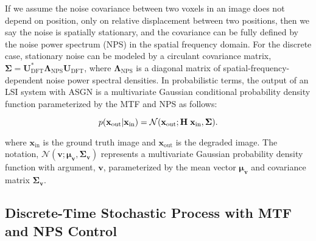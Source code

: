 \documentclass[12pt,]{article}
\begin{document}
If we assume the noise covariance between two voxels in an image does not depend on position, only on relative displacement between two positions, then we say the noise is spatially stationary, and the covariance can be fully defined by the noise power spectrum (NPS) in the spatial frequency domain. For the discrete case, stationary noise can be modeled by a circulant covariance matrix, $\boldsymbol{\Sigma} = \mathbf{U}^*_\text{DFT} \boldsymbol{\Lambda}_\text{NPS} \mathbf{U}_\text{DFT}$, where $\boldsymbol{\Lambda}_\text{NPS}$ is a diagonal matrix of spatial-frequency-dependent noise power spectral densities. In probabilistic terms, the output of an LSI system with ASGN is a multivariate Gaussian conditional probability density function parameterized by the MTF and NPS as follows:

\begin{equation}
    p(\mathbf{x}_\text{out}|\mathbf{x}_\text{in}) =  \mathcal{N}(\mathbf{x}_\text{out};  \mathbf{H} \hspace{1mm} \mathbf{x}_\text{in}, \boldsymbol{\Sigma} ).
\end{equation}

\noindent where $\mathbf{x}_\text{in}$ is the ground truth image and $\mathbf{x}_\text{out}$ is the degraded image. The notation, $\mathcal{N}(\mathbf{v};\boldsymbol{\mu}_\mathbf{v},\boldsymbol{\Sigma}_\mathbf{v})$ represents a multivariate Gaussian probability density function with argument, $\mathbf{v}$, parameterized by the mean vector $\boldsymbol{\mu}_\mathbf{v}$ and covariance matrix $\boldsymbol{\Sigma}_\mathbf{v}$.    




\subsection{Discrete-Time Stochastic Process with MTF and NPS Control}
\end{document}
